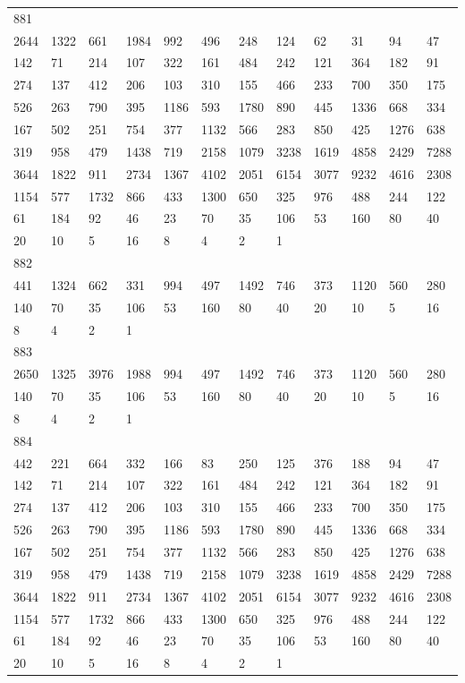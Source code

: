 \begin{longtable}{llllllllllll}
881&&&&&&&&&&&\\
2644& 1322& 661& 1984& 992& 496& 248& 124& 62& 31& 94& 47\\
142& 71& 214& 107& 322& 161& 484& 242& 121& 364& 182& 91\\
274& 137& 412& 206& 103& 310& 155& 466& 233& 700& 350& 175\\
526& 263& 790& 395& 1186& 593& 1780& 890& 445& 1336& 668& 334\\
167& 502& 251& 754& 377& 1132& 566& 283& 850& 425& 1276& 638\\
319& 958& 479& 1438& 719& 2158& 1079& 3238& 1619& 4858& 2429& 7288\\
3644& 1822& 911& 2734& 1367& 4102& 2051& 6154& 3077& 9232& 4616& 2308\\
1154& 577& 1732& 866& 433& 1300& 650& 325& 976& 488& 244& 122\\
61& 184& 92& 46& 23& 70& 35& 106& 53& 160& 80& 40\\
20& 10& 5& 16& 8& 4& 2& 1& \\

882&&&&&&&&&&&\\
441& 1324& 662& 331& 994& 497& 1492& 746& 373& 1120& 560& 280\\
140& 70& 35& 106& 53& 160& 80& 40& 20& 10& 5& 16\\
8& 4& 2& 1& \\

883&&&&&&&&&&&\\
2650& 1325& 3976& 1988& 994& 497& 1492& 746& 373& 1120& 560& 280\\
140& 70& 35& 106& 53& 160& 80& 40& 20& 10& 5& 16\\
8& 4& 2& 1& \\

884&&&&&&&&&&&\\
442& 221& 664& 332& 166& 83& 250& 125& 376& 188& 94& 47\\
142& 71& 214& 107& 322& 161& 484& 242& 121& 364& 182& 91\\
274& 137& 412& 206& 103& 310& 155& 466& 233& 700& 350& 175\\
526& 263& 790& 395& 1186& 593& 1780& 890& 445& 1336& 668& 334\\
167& 502& 251& 754& 377& 1132& 566& 283& 850& 425& 1276& 638\\
319& 958& 479& 1438& 719& 2158& 1079& 3238& 1619& 4858& 2429& 7288\\
3644& 1822& 911& 2734& 1367& 4102& 2051& 6154& 3077& 9232& 4616& 2308\\
1154& 577& 1732& 866& 433& 1300& 650& 325& 976& 488& 244& 122\\
61& 184& 92& 46& 23& 70& 35& 106& 53& 160& 80& 40\\
20& 10& 5& 16& 8& 4& 2& 1& \\


\end{longtable}

